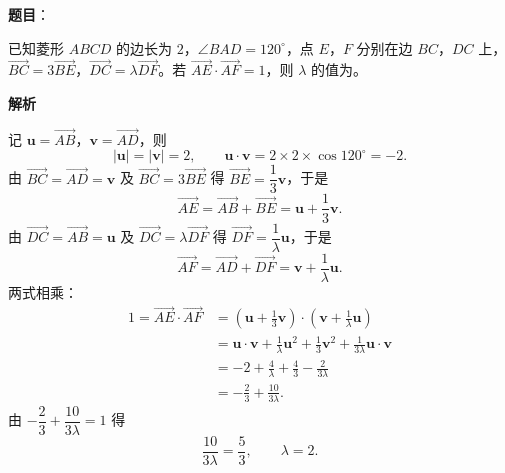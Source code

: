 \begin{answer}

\textbf{题目}：

已知菱形 $ABCD$ 的边长为 $2$，$\angle BAD=120^\circ$，点 $E$，$F$ 分别在边 $BC$，$DC$ 上，$\overrightarrow{BC}=3\overrightarrow{BE}$，$\overrightarrow{DC}=\lambda\overrightarrow{DF}$。若 $\overrightarrow{AE}\cdot\overrightarrow{AF}=1$，则 $\lambda$ 的值为\gkblank{}。

\textbf{解析}

记 $\boldsymbol u=\overrightarrow{AB}$，$\boldsymbol v=\overrightarrow{AD}$，则
\nopagebreak[4]
\[|\boldsymbol u|=|\boldsymbol v|=2,\qquad \boldsymbol u\cdot\boldsymbol v=2\times 2\times\cos120^\circ=-2.\]
由 $\overrightarrow{BC}=\overrightarrow{AD}=\boldsymbol v$ 及 $\overrightarrow{BC}=3\overrightarrow{BE}$ 得 $\overrightarrow{BE}=\dfrac13\boldsymbol v$，于是
\nopagebreak[4]
\[\overrightarrow{AE}=\overrightarrow{AB}+\overrightarrow{BE}=\boldsymbol u+\frac13\boldsymbol v.\]
由 $\overrightarrow{DC}=\overrightarrow{AB}=\boldsymbol u$ 及 $\overrightarrow{DC}=\lambda\overrightarrow{DF}$ 得 $\overrightarrow{DF}=\dfrac1\lambda\boldsymbol u$，于是
\nopagebreak[4]
\[\overrightarrow{AF}=\overrightarrow{AD}+\overrightarrow{DF}=\boldsymbol v+\frac1\lambda\boldsymbol u.\]
两式相乘：
\nopagebreak[4]
\[\begin{aligned}
1=\overrightarrow{AE}\cdot\overrightarrow{AF}
&=\left(\boldsymbol u+\frac13\boldsymbol v\right)\cdot\left(\boldsymbol v+\frac1\lambda\boldsymbol u\right)\\
&=\boldsymbol u\cdot\boldsymbol v+\frac1\lambda\boldsymbol u^2+\frac13\boldsymbol v^2+\frac{1}{3\lambda}\boldsymbol u\cdot\boldsymbol v\\
&=-2+\frac4\lambda+\frac43-\frac{2}{3\lambda}\\
&=-\frac23+\frac{10}{3\lambda}.
\end{aligned}\]
由 $-\dfrac23+\dfrac{10}{3\lambda}=1$ 得
\nopagebreak[4]
\[\frac{10}{3\lambda}=\frac53,\qquad \lambda=2.\]


\end{answer}
